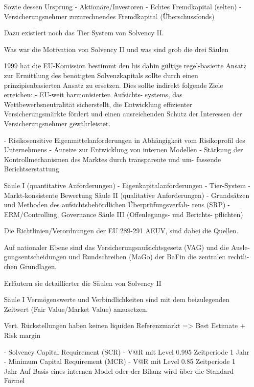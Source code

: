 Sowie dessen Ursprung 
- Aktionäre/Investoren 
- Echtes Fremdkapital (selten)
- Versicherungsnehmer zuzurechnendes Fremdkapital (Überschussfonds)

Dazu existiert noch das Tier System von Solvency II.



Was war die Motivation von Solvency II und was sind grob die drei Säulen 

1999 hat die EU-Komission bestimmt den bis dahin gültige regel-basierte Ansatz zur Ermittlung des benötigten Solvenzkapitals sollte durch einen
prinzipienbasierten Ansatz zu ersetzen.
Dies sollte indirekt folgende Ziele erreichen:
- EU-weit harmonisierten Aufsichts-
systems, das Wettbewerbsneutralität sicherstellt, die Entwicklung effizienter
Versicherungsmärkte fördert und einen ausreichenden Schutz der Interessen
der Versicherungsnehmer gewährleistet.

- Risikosensitive Eigenmittelanforderungen in Abhängigkeit vom Risikoprofil des Unternehmens 
- Anreize zur Entwicklung von internen Modellen
- Stärkung der Kontrollmechanismen des Marktes durch transparente und um-
fassende Berichtserstattung

Säule I (quantitative Anforderungen)
- Eigenkapitalanforderungen 
- Tier-System 
- Markt-konsistente Bewertung
Säule II (qualitative Anforderungen)
- Grundsätzen und Methoden des aufsichtsbehördlichen Überprüfungsverfah-
rens (SRP)
- ERM/Controlling, Governance
Säule III (Offenlegungs- und Berichts-
pflichten)


Die Richtlinien/Verordnungen der EU 289-291 AEUV, sind dabei die Quellen.

Auf nationaler Ebene sind das Versicherungsaufsichtsgesetz (VAG) und die Ausle-
gungsentscheidungen und Rundschreiben (MaGo) der BaFin die zentralen rechtli-
chen Grundlagen.



Erläutern sie detaillierter die Säulen von Solvency II


Säule I
Vermögenswerte und Verbindlichkeiten sind mit dem beizulegenden Zeitwert
(Fair Value/Market Value) anzusetzen. 

Vert. Rückstellungen haben keinen liquiden Referenzmarkt => Best Estimate + Risk margin

- Solvency Capital Requirement (SCR) 
- V@R mit Level 0.995 Zeitperiode 1 Jahr
- Minimum Capital Requirement (MCR)
- V@R mit Level 0.85 Zeitperiode 1 Jahr
Auf Basis eines internen Model oder der Bilanz wird über die Standard Formel 


